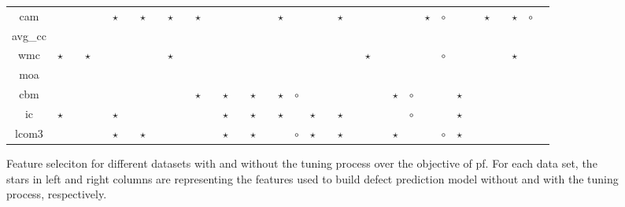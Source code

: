 \documentclass{sig-alternative}
\begin{document}
\begin{figure}[!ht]
\begin{tabular}{c|c c|c c|c c|c c|c c|c c|c c|c c|c c|c c|c c|c c|c c|c c|c c|c c|c c|c }
cam& & & & & $\star$& & $\star$& & $\star$& & $\star$& & & & & & $\star$& & & & $\star$& & & & & & $\star$& $\circ$& & & $\star$& & $\star$& $\circ$\\
avg\_cc& & & & & & & & & & & & & & & & & & & & & & & & & & & & & & & & & & \\
wmc& $\star$& & $\star$& & & & & & $\star$& & & & & & & & & & & & & & $\star$& & & & & $\circ$& & & & & $\star$& \\
moa& & & & & & & & & & & & & & & & & & & & & & & & & & & & & & & & & & \\
cbm& & & & & & & & & & & $\star$& & $\star$& & $\star$& & $\star$& $\circ$& & & & & & & $\star$& $\circ$& & & $\star$& & & & & \\
ic& $\star$& & & & $\star$& & & & & & & & $\star$& & $\star$& & $\star$& & $\star$& & $\star$& & & & & $\circ$& & & $\star$& & & & & \\
lcom3& & & & & $\star$& & $\star$& & & & & & $\star$& & $\star$& & & $\circ$& $\star$& & $\star$& & & & $\star$& & & $\circ$& $\star$& & & & & \\

  \end{tabular}
      \caption{Feature seleciton for different datasets with  and without the tuning process over the objective of pf. For each data set, the stars in left and right columns are representing the features used to build defect prediction model without and with the tuning process, respectively.
 }
\end{figure}
\end{document}
